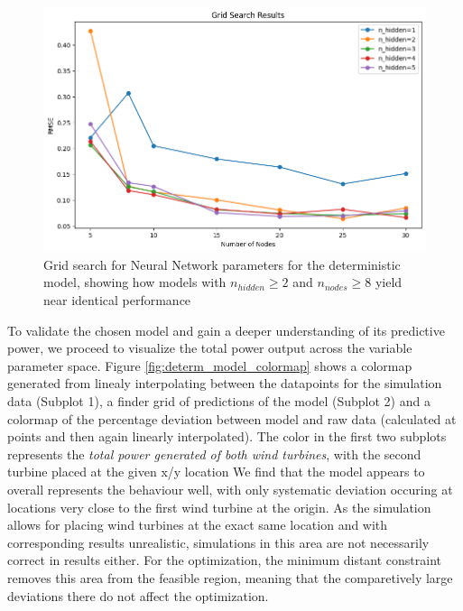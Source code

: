 \begin{figure}[h] 
	\centering
	\includegraphics[width=1\textwidth]{figures/optimization/determ_nn_opti.png} 
	\caption{Grid search for Neural Network parameters for the deterministic model, showing how models with $n_{hidden} \geq 2$ and $n_{nodes} \geq 8$ yield near identical performance}
	\label{fig:determ_nn_opti}
\end{figure}

To validate the chosen model and gain a deeper understanding of its predictive power, we proceed to visualize the total power output across the variable parameter space. Figure \ref{fig:determ_model_colormap} shows a colormap generated from linealy interpolating between the datapoints for the simulation data (Subplot 1), a finder grid of predictions of the model (Subplot 2) and a colormap of the percentage deviation between model and raw data (calculated at points and then again linearly interpolated). The color in the first two subplots represents the \textit{total power generated of both wind turbines}, with the second turbine placed at the given x/y location We find that the model appears to overall represents the behaviour well, with only systematic deviation occuring at locations very close to the first wind turbine at the origin. As the simulation allows for placing wind turbines at the exact same location and with corresponding results unrealistic, simulations in this area are not necessarily correct in results either. For the optimization, the minimum distant constraint removes this area from the feasible region, meaning that the comparetively large deviations there do not affect the optimization. 

